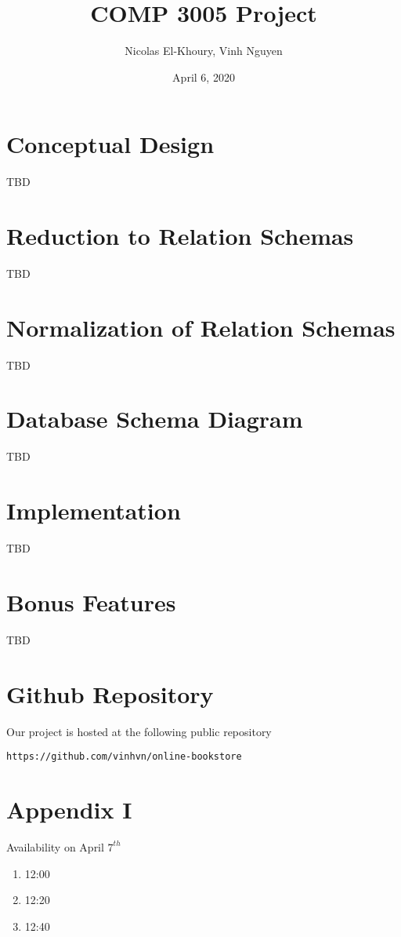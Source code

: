 \documentclass{article}
\title{COMP 3005 Project}
\author{Nicolas El-Khoury, Vinh Nguyen}
\date{April 6, 2020}
\begin{document}
    \maketitle

    \section{Conceptual Design}

    TBD

    \section{Reduction to Relation Schemas}

    TBD

    \section{Normalization of Relation Schemas}

    TBD

    \section{Database Schema Diagram}

    TBD

    \section{Implementation}

    TBD

    \section{Bonus Features}

    TBD

    \section{Github Repository}

    Our project is hosted at the following public repository
    \begin{verbatim}
https://github.com/vinhvn/online-bookstore
    \end{verbatim}

    \section{Appendix I}

    Availability on April $7^{th}$
    \begin{enumerate}
        \item 12:00
        \item 12:20
        \item 12:40
    \end{enumerate}
\end{document}
